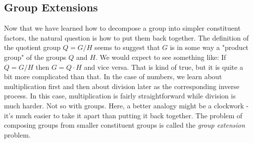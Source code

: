 












\subsection{Group Extensions}
Now that we have learned how to decompose a group into simpler constituent factors, the natural question is how to put them back together. The definition of the quotient group $Q = G / H$ seems to suggest that $G$ is in some way a "product group" of the groups $Q$ and $H$. We would expect to see something like: If $Q = G / H$ then $G = Q \cdot H$ and vice versa. That is kind of true, but it is quite a bit more complicated than that. In the case of numbers, we learn about multiplication first and then about division later as the corresponding inverse process. In this case, multiplication is fairly straightforward while division is much harder. Not so with groups. Here, a better analogy might be a clockwork - it's much easier to take it apart than putting it back together. The problem of composing groups from smaller constituent groups is called the \emph{group extension} problem. 


